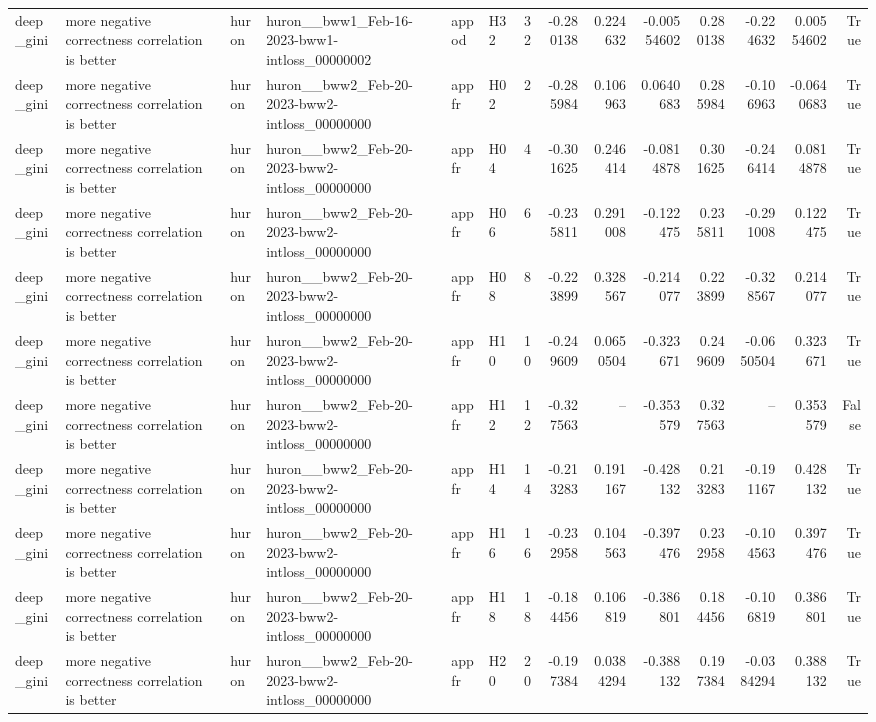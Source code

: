 \begin{longtable}{llllllrrrrrrrr}
deep\_gini & more negative correctness correlation is better & huron & huron\_\_bww1\_Feb-16-2023-bww1-intloss\_00000002 & appod & H32 & 32 & -0.280138 & 0.224632 & -0.00554602 & 0.280138 & -0.224632 & 0.00554602 & True \\
deep\_gini & more negative correctness correlation is better & huron & huron\_\_bww2\_Feb-20-2023-bww2-intloss\_00000000 & appfr & H02 & 2 & -0.285984 & 0.106963 & 0.0640683 & 0.285984 & -0.106963 & -0.0640683 & True \\
deep\_gini & more negative correctness correlation is better & huron & huron\_\_bww2\_Feb-20-2023-bww2-intloss\_00000000 & appfr & H04 & 4 & -0.301625 & 0.246414 & -0.0814878 & 0.301625 & -0.246414 & 0.0814878 & True \\
deep\_gini & more negative correctness correlation is better & huron & huron\_\_bww2\_Feb-20-2023-bww2-intloss\_00000000 & appfr & H06 & 6 & -0.235811 & 0.291008 & -0.122475 & 0.235811 & -0.291008 & 0.122475 & True \\
deep\_gini & more negative correctness correlation is better & huron & huron\_\_bww2\_Feb-20-2023-bww2-intloss\_00000000 & appfr & H08 & 8 & -0.223899 & 0.328567 & -0.214077 & 0.223899 & -0.328567 & 0.214077 & True \\
deep\_gini & more negative correctness correlation is better & huron & huron\_\_bww2\_Feb-20-2023-bww2-intloss\_00000000 & appfr & H10 & 10 & -0.249609 & 0.0650504 & -0.323671 & 0.249609 & -0.0650504 & 0.323671 & True \\
deep\_gini & more negative correctness correlation is better & huron & huron\_\_bww2\_Feb-20-2023-bww2-intloss\_00000000 & appfr & H12 & 12 & -0.327563 & -- & -0.353579 & 0.327563 & -- & 0.353579 & False \\
deep\_gini & more negative correctness correlation is better & huron & huron\_\_bww2\_Feb-20-2023-bww2-intloss\_00000000 & appfr & H14 & 14 & -0.213283 & 0.191167 & -0.428132 & 0.213283 & -0.191167 & 0.428132 & True \\
deep\_gini & more negative correctness correlation is better & huron & huron\_\_bww2\_Feb-20-2023-bww2-intloss\_00000000 & appfr & H16 & 16 & -0.232958 & 0.104563 & -0.397476 & 0.232958 & -0.104563 & 0.397476 & True \\
deep\_gini & more negative correctness correlation is better & huron & huron\_\_bww2\_Feb-20-2023-bww2-intloss\_00000000 & appfr & H18 & 18 & -0.184456 & 0.106819 & -0.386801 & 0.184456 & -0.106819 & 0.386801 & True \\
deep\_gini & more negative correctness correlation is better & huron & huron\_\_bww2\_Feb-20-2023-bww2-intloss\_00000000 & appfr & H20 & 20 & -0.197384 & 0.0384294 & -0.388132 & 0.197384 & -0.0384294 & 0.388132 & True \\

\end{longtable}
